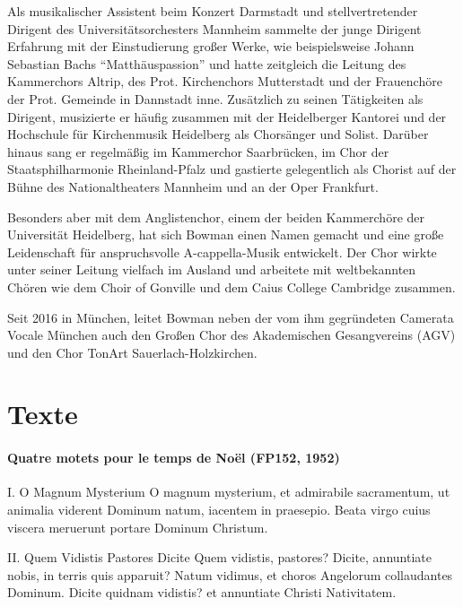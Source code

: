 \documentclass[11pt, ngermanm, titlepage]{article}
\begin{document}
\begin{multicols}{2}
	Als musikalischer Assistent beim Konzert Darmstadt und stellvertretender Dirigent des Universitätsorchesters Mannheim sammelte der junge Dirigent Erfahrung mit der Einstudierung großer Werke, wie beispielsweise Johann Sebastian Bachs "`Matthäuspassion"' und hatte zeitgleich die Leitung des Kammerchors Altrip, des Prot. Kirchenchors Mutterstadt und der Frauenchöre der Prot. Gemeinde in Dannstadt inne. Zusätzlich zu seinen Tätigkeiten als Dirigent, musizierte er häufig zusammen mit der Heidelberger Kantorei und der Hochschule für Kirchenmusik Heidelberg als Chorsänger und Solist. Darüber hinaus sang er regelmäßig im Kammerchor Saarbrücken, im Chor der Staatsphilharmonie Rheinland-Pfalz und gastierte gelegentlich als Chorist auf der Bühne des Nationaltheaters Mannheim und an der Oper Frankfurt.
	 
	Besonders aber mit dem Anglistenchor, einem der beiden Kammerchöre der Universität Heidelberg, hat sich Bowman einen Namen gemacht und eine große Leidenschaft für anspruchsvolle A-cappella-Musik entwickelt. Der Chor wirkte unter seiner Leitung vielfach im Ausland und arbeitete mit weltbekannten Chören wie dem Choir of Gonville und dem Caius College Cambridge zusammen.
	 
	Seit 2016 in München, leitet Bowman neben der vom ihm gegründeten Camerata Vocale München auch den Großen Chor des Akademischen Gesangvereins (AGV) und den Chor TonArt Sauerlach-Holzkirchen.
	
	\section*{Texte}
	
	\paragraph{Quatre motets pour le temps de Noël (FP152, 1952)\newline}
	I. O Magnum Mysterium\newline
	O magnum mysterium,\newline
	et admirabile sacramentum,\newline
	ut animalia viderent Dominum natum,\newline
	iacentem in praesepio.\newline
	Beata virgo cuius viscera meruerunt\newline
	portare Dominum Christum.\newline
	
	II. Quem Vidistis Pastores Dicite\newline
	Quem vidistis, pastores? Dicite,\newline
	annuntiate nobis, in terris quis apparuit?\newline
	Natum vidimus,\newline
	et choros Angelorum collaudantes Dominum.\newline
	Dicite quidnam vidistis?\newline
	et annuntiate Christi Nativitatem.\newline
	

\end{multicols}
\end{document}
